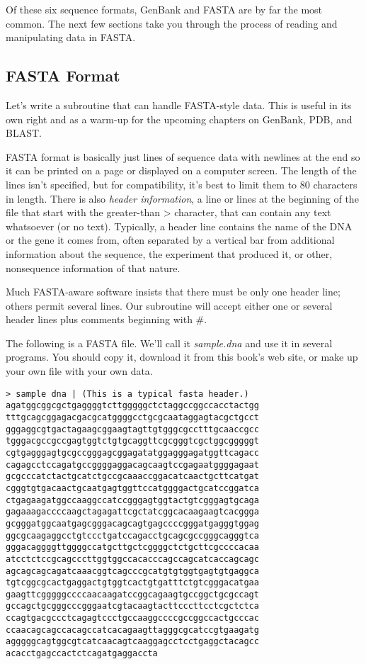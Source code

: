 Of these six sequence formats, GenBank and FASTA are by far the most common. The next few sections take you through the process of reading and manipulating data in FASTA. 

\subsection{FASTA Format}
Let's write a subroutine that can handle FASTA-style data. This is useful in its own right and as a warm-up for the upcoming chapters on GenBank, PDB, and BLAST.

FASTA format is basically just lines of sequence data with newlines at the end so it can be printed on a page or displayed on a computer screen. The length of the lines isn't specified, but for compatibility, it's best to limit them to 80 characters in length. There is also \textit{header information}, a line or lines at the beginning of the file that start with the greater-than > character, that can contain any text whatsoever (or no text). Typically, a header line contains the name of the DNA or the gene it comes from, often separated by a vertical bar from additional information about the sequence, the experiment that produced it, or other, nonsequence information of that nature.

Much FASTA-aware software insists that there must be only one header line; others permit several lines. Our subroutine will accept either one or several header lines plus comments beginning with \#.

The following is a FASTA file. We'll call it \textit{sample.dna} and use it in several programs. You should copy it, download it from this book's web site, or make up your own file with your own data. 

\begin{lstlisting}
> sample dna | (This is a typical fasta header.)
agatggcggcgctgaggggtcttgggggctctaggccggccacctactgg
tttgcagcggagacgacgcatggggcctgcgcaataggagtacgctgcct
gggaggcgtgactagaagcggaagtagttgtgggcgcctttgcaaccgcc
tgggacgccgccgagtggtctgtgcaggttcgcgggtcgctggcgggggt
cgtgagggagtgcgccgggagcggagatatggagggagatggttcagacc
cagagcctccagatgccggggaggacagcaagtccgagaatggggagaat
gcgcccatctactgcatctgccgcaaaccggacatcaactgcttcatgat
cgggtgtgacaactgcaatgagtggttccatggggactgcatccggatca
ctgagaagatggccaaggccatccgggagtggtactgtcgggagtgcaga
gagaaagaccccaagctagagattcgctatcggcacaagaagtcacggga
gcgggatggcaatgagcgggacagcagtgagccccgggatgagggtggag
ggcgcaagaggcctgtccctgatccagacctgcagcgccgggcagggtca
gggacaggggttggggccatgcttgctcggggctctgcttcgccccacaa
atcctctccgcagcccttggtggccacacccagccagcatcaccagcagc
agcagcagcagatcaaacggtcagcccgcatgtgtggtgagtgtgaggca
tgtcggcgcactgaggactgtggtcactgtgatttctgtcgggacatgaa
gaagttcgggggccccaacaagatccggcagaagtgccggctgcgccagt
gccagctgcgggcccgggaatcgtacaagtacttcccttcctcgctctca
ccagtgacgccctcagagtccctgccaaggccccgccggccactgcccac
ccaacagcagccacagccatcacagaagttagggcgcatccgtgaagatg
agggggcagtggcgtcatcaacagtcaaggagcctcctgaggctacagcc
acacctgagccactctcagatgaggaccta
\end{lstlisting}

